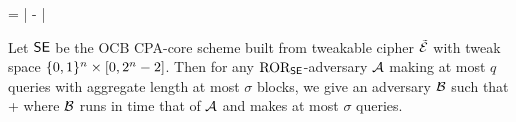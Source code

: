 



\bnm
\AdvROR{\SE}{\advA} = \left| -  \right| 
\enm

\begin{theorem}
Let ${\mathsf{SE}}$ be the OCB CPA-core scheme built from tweakable cipher
$\tilde{{\cal E}}$ with tweak space $\{0,1\}^n\times[0,2^n-2]$.
Then for any $\textnormal{ROR}_{\mathsf{SE}}$-adversary ${\mathcal A}$
making at most $q$ queries with aggregate length at most $\sigma$
blocks, we give an adversary ${\mathcal B}$ such that
\bnm
  \AdvROR{\SE}{\advA} \le \AdvTPRP{\tweakCipher}{\advB} + 
\enm
where ${\mathcal B}$ runs in time that of ${\mathcal A}$ and makes at most $\sigma$ queries.
\end{theorem}



